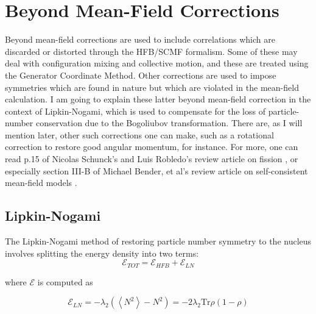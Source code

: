 \chapter{Beyond Mean-Field Corrections}

\maketitle

Beyond mean-field corrections are used to include correlations which are discarded or distorted through the HFB/SCMF formalism. Some of these may deal with configuration mixing and collective motion, and these are treated using the Generator Coordinate Method. Other corrections are used to impose symmetries which are found in nature but which are violated in the mean-field calculation. I am going to explain these latter beyond mean-field correction in the context of Lipkin-Nogami, which is used to compensate for the loss of particle-number conservation due to the Bogoliubov transformation. There are, as I will mention later, other such corrections one can make, such as a rotational correction to restore good angular momentum, for instance. For more, one can read p.15 of Nicolas Schunck's and Luis Robledo's review article on fission \cite{Schunck2016review}, or especially section III-B of Michael Bender, et al's review article on self-consistent mean-field models \cite{Bender2003}.

\section*{Lipkin-Nogami}
The Lipkin-Nogami method of restoring particle number symmetry to the nucleus involves splitting the energy density into two terms:
\begin{equation*}
\mathcal{E}_{TOT} = \mathcal{E}_{HFB} + \mathcal{E}_{LN}
\end{equation*}

\noindent where $\mathcal{E}$ is computed as

\begin{equation*}
\mathcal{E}_{LN} = -\lambda_2\left(\left\langle N^2\right\rangle -N^2\right) = -2\lambda_2 \mathrm{Tr}\rho\left(1-\rho\right)
\end{equation*}

